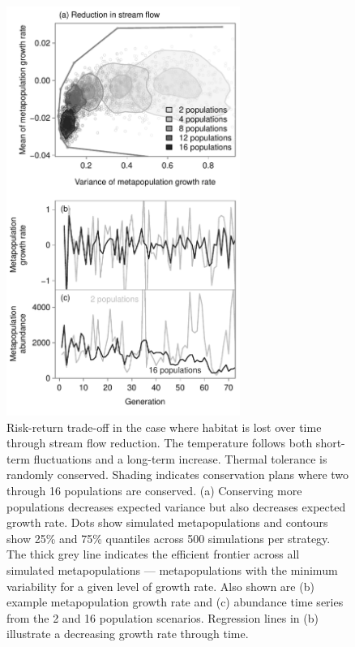 \begin{figure}[htbp]
\includegraphics[width=3.0in]{metafolio/Fig6}
\centering
\caption{Risk-return trade-off in the case where habitat is lost over time through stream flow reduction. The temperature follows both short-term fluctuations and a long-term increase. Thermal tolerance is randomly conserved. Shading indicates conservation plans where two through 16 populations are conserved. (a) Conserving more populations decreases expected variance but also decreases expected growth rate. Dots show simulated metapopulations and contours show 25\% and 75\% quantiles across 500 simulations per strategy. The thick grey line indicates the efficient frontier across all simulated metapopulations --- metapopulations with the minimum variability for a given level of growth rate. Also shown are (b) example metapopulation growth rate and (c) abundance time series from the 2 and 16 population scenarios. Regression lines in (b) illustrate a decreasing growth rate through time.} \label{f:squeeze}
\end{figure}
